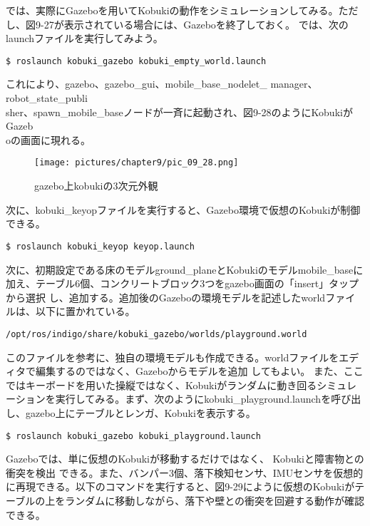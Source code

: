 では、実際にGazeboを用いてKobukiの動作をシミュレーションしてみる。ただし、図9-27が表示されている場合には、Gazeboを終了しておく。 では、次のlaunchファイルを実行してみよう。

\begin{lstlisting}[language=ROS]
$ roslaunch kobuki_gazebo kobuki_empty_world.launch
\end{lstlisting}

これにより、gazebo、gazebo\_gui、mobile\_base\_nodelet\_ manager、robot\_state\_publi\\sher、spawn\_mobile\_baseノードが一斉に起動され、図9-28のようにKobukiがGazeb\\oの画面に現れる。

\begin{figure}[htp]
  \centering
  \texttt{[image: pictures/chapter9/pic\_09\_28.png]}
  \caption{gazebo上kobukiの3次元外観}
\end{figure}

次に、kobuki\_keyopファイルを実行すると、Gazebo環境で仮想のKobukiが制御できる。

\begin{lstlisting}[language=ROS]
$ roslaunch kobuki_keyop keyop.launch
\end{lstlisting}

次に、初期設定である床のモデルground\_planeとKobukiのモデルmobile\_baseに加え、テーブル6個、コンクリートブロック3つをgazebo画面の「insert」タップから選択   し、追加する。追加後のGazeboの環境モデルを記述したworldファイルは、以下に置かれている。

\begin{lstlisting}[language=ROS]
/opt/ros/indigo/share/kobuki_gazebo/worlds/playground.world
\end{lstlisting}

このファイルを参考に、独自の環境モデルも作成できる。worldファイルをエディタで編集するのではなく、Gazeboからモデルを追加  してもよい。
また、ここではキーボードを用いた操縦ではなく、Kobukiがランダムに動き回るシミュレーションを実行してみる。まず、次のようにkobuki\_playground.launchを呼び出し、gazebo上にテーブルとレンガ、Kobukiを表示する。

\begin{lstlisting}[language=ROS]
$ roslaunch kobuki_gazebo kobuki_playground.launch
\end{lstlisting}

Gazeboでは、単に仮想のKobukiが移動するだけではなく、  Kobukiと障害物との衝突を検出  できる。また、バンパー3個、落下検知センサ、IMUセンサを仮想的に再現できる。以下のコマンドを実行すると、図9-29にように仮想のKobukiがテーブルの上をランダムに移動しながら、落下や壁との衝突を回避する動作が確認できる。

